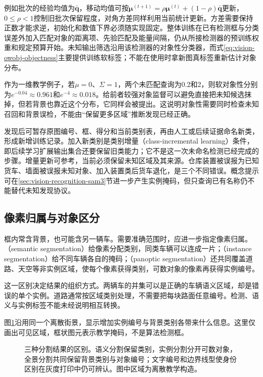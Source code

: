 例如批次的经验均值为$\bar{\bm q}$，移动均值可按$\bm\mu^{(t+1)}=\rho\bm\mu^{(t)}+(1-\rho)\bar{\bm q}$更新，$0\leq\rho<1$控制旧批次保留程度，对角方差同样利用当前统计更新。方差需要保持正数才能求逆，初始化和数值下界必须随实现固定。整体训练在已有检测框与分类误差外加入匹配对象的距离项、先验匹配及能量间隔，仍从所接检测器的预训练权重和规定预算开始。未知输出筛选沿用该检测器的对象性分类器，而式\eqref{eq:vision-owobj-objectness}主要提供训练软标签；不能在使用时拿新图真标签重新估计对象分布。

作为一维教学例子，若$\mu=0$、$\Sigma=1$，两个未匹配查询为0.2和2，则软对象性分别为$e^{-0.04}\approx0.961$和$e^{-4}\approx0.018$。给前者较强对象监督可以避免直接把未知候选抹掉，但若背景也靠近这个分布，它同样会被提出。这说明对象性需要同时检查未知召回和背景误检，不能由“保留更多区域”推断发现已经正确。

发现后可暂存原图编号、框、得分和当前类别表，再由人工或后续证据命名新类，形成新增训练记录。加入新类别是类别增量（class-incremental learning）条件，即后续学习扩展输出集合还要保留旧类能力；它不是这一次未命名检测已经完成的步骤。增量更新可参考，当前必须保留未知区域及其来源。仓库装置被误报为已知货车、墙面被误报未知对象、加入装置类后货车退化，是三个不同错误。概念提示可在\ref{sec:vision-recognition-sam3}节进一步产生实例掩码，但只查询已有名称仍不能替代未知发现协议。

\subsection{像素归属与对象区分}
\label{sec:vision-recognition-segmentation}

框内常含背景，也可能含另一辆车。需要准确范围时，应进一步指定像素归属。（semantic segmentation）给像素分配类别，同类车辆可以连成一片；（instance segmentation）给不同车辆各自的掩码；（panoptic segmentation）还共同覆盖道路、天空等非实例区域，使每个像素获得类别，可数对象的像素再获得实例编号。

这一区别决定结果的组织方式。两辆车的并集可以是正确的车辆语义区域，却是错误的单个实例。道路通常按区域类别处理，不需要把每块路面任意编号。检测、语义与实例标签不能未经说明相互转换。

图\ref{fig:vision-segmentation-outputs}沿用同一个离散街景，显示增加实例编号与背景类别各带来什么信息。这里仅画出可见区域，框状图元表示教学掩码，不是算法检测框。

\begin{figure}[htbp]
 \centering
 
 \caption{三种分割结果的区别。语义分割保留类别，实例分割分开可数对象，全景分割共同保留背景类别与对象编号；文字编号和边界线型使身份区别在灰度打印中仍可辨认。图中区域为离散教学构造。}
 \label{fig:vision-segmentation-outputs}
\end{figure}

